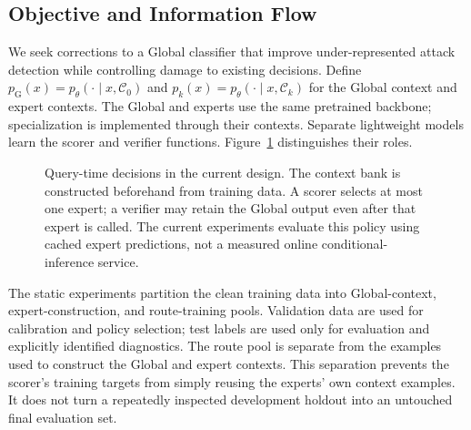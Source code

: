 \documentclass[sigconf,anonymous,pbalance]{acmart}
\newcommand{\globalidx}{\mathrm{G}}
\newcommand{\ctx}{\mathcal{C}}
\begin{document}
\subsection{Objective and Information Flow}
We seek corrections to a Global classifier that improve under-represented attack detection while controlling damage to existing decisions. Define $p_{\globalidx}(x)=p_{\theta}(\cdot\mid x,\ctx_0)$ and $p_k(x)=p_{\theta}(\cdot\mid x,\ctx_k)$ for the Global context and expert contexts. The Global and experts use the same pretrained backbone; specialization is implemented through their contexts. Separate lightweight models learn the scorer and verifier functions. Figure~\ref{fig:architecture} distinguishes their roles.

\begin{figure}[t]
\centering
{}
\caption{Query-time decisions in the current design. The context bank is constructed beforehand from training data. A scorer selects at most one expert; a verifier may retain the Global output even after that expert is called. The current experiments evaluate this policy using cached expert predictions, not a measured online conditional-inference service.}
\label{fig:architecture}
\end{figure}

The static experiments partition the clean training data into Global-context, expert-construction, and route-training pools. Validation data are used for calibration and policy selection; test labels are used only for evaluation and explicitly identified diagnostics. The route pool is separate from the examples used to construct the Global and expert contexts. This separation prevents the scorer's training targets from simply reusing the experts' own context examples. It does not turn a repeatedly inspected development holdout into an untouched final evaluation set.
\end{document}
